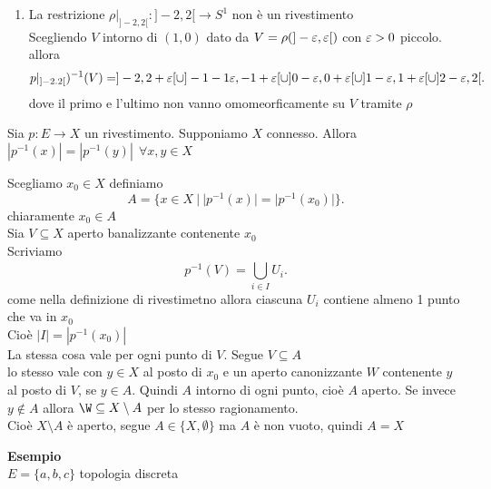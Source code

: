 \documentclass[12px]{article}
\begin{document}
\begin{enumerate}
preso $(x_0,y_0)\in S^1$ scegliamo $t_0\in \R$ tale che $\rho(t_0) = (x_0,y_0)$\\
l'intervallo $]t_0 = \frac 14, t_0 + \frac 14[$ va nella semicirconferenza che contiene $(x_0,v_0)$ nel mezzo.\\
Allora $\rho^{-1}(V) = \bigcup^{}_{n\in\Z}]t_0-\frac 14 + n, t_0 + \frac 14 + n[$ con $U_n = ]t_0 - \frac 15 + n, t_0 + \frac 14 + n[$ sono aperti e disgiunti, ciascuno va omeomorficamente in $V$ tramite $\rho$ (esercizi settimanali) 
\item La restrizione $\rho|_{]-2,2[}:]-2,2[ \rightarrow S^1$ non è un rivestimento\\
	Scegliendo $V$ intorno di $(1,0)$  dato da  $V = \rho(]-\varepsilon, \varepsilon[) $ con $\varepsilon > 0 $ piccolo.\\
	allora
	\[
		p|_{]-2.2[})^{-1}(V) = ]-2,2+\e[\cup ]-1-1\e,-1+\e[ \cup 
		]0-\e, 0 + \e[\cup]1-\e, 1 + \e[\cup ]2-\e, 2[

	.\] 
	dove il primo e l'ultimo non vanno omomeorficamente su $V$ tramite $\rho$
	\end{enumerate}
	\begin{prop}
		Sia $p: E \rightarrow X $ un rivestimento. Supponiamo $X$ connesso. Allora $|p^{-1}(x)| = |p^{-1}(y)|\ \ \forall x,y\in X$
	\end{prop}
	\begin{dimo}
		Scegliamo $x_0\in X$ definiamo 
		\[
			A= \{x\in X\ |\ |p^{-1}(x)| = |p^{-1}(x_0)|\}
		.\] 
		chiaramente $x_0\in A$\\
		Sia $V\subseteq X$ aperto banalizzante contenente  $x_0$ \\
		Scriviamo
		\[
			p^{-1}(V) = \bigcup^{}_{i\in I}U_i
		.\] 
		come nella definizione di rivestimetno allora ciascuna $U_i$ contiene almeno 1 punto che va in  $x_0$\\
	Cioè $|I| = |p^{-1}(x_0)|$\\
	La stessa cosa vale per ogni punto di $V$. Segue $V\subseteq A$\\
	lo stesso vale con  $y\in X$ al posto di  $x_0$ e un aperto canonizzante $W$ contenente $y$ al posto di $V$,  se $y\in A$. Quindi  $A$ intorno di ogni punto, cioè $A$ aperto. Se invece $y\not\in A$ allora  $\W\subseteq X \setminus A$ per lo stesso ragionamento. \\
	Cioè  $X\setminus A$ è aperto, segue $A\in \{X,\emptyset\}$  ma  $A$ è non vuoto, quindi $A = X$
	\end{dimo}
	\textbf{Esempio}\\
	$E = \{a,b,c\}$ topologia discreta\\
\end{document}
